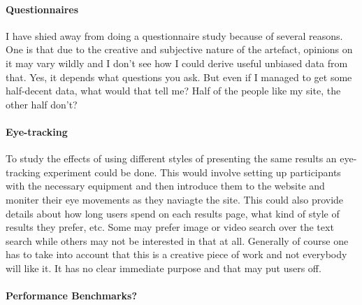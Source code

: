 \paragraph{Questionnaires}
I have shied away from doing a questionnaire study because of several reasons. One is that due to the creative and subjective nature of the artefact, opinions on it may vary wildly and I don't see how I could derive useful unbiased data from that. Yes, it depends what questions you ask. But even if I managed to get some half-decent data, what would that tell me? Half of the people like my site, the other half don't?


\paragraph{Eye-tracking}
To study the effects of using different styles of presenting the same results an eye-tracking experiment could be done. This would involve setting up participants with the necessary equipment and then introduce them to the website and moniter their eye movements as they naviagte the site. This could also provide details about how long users spend on each results page, what kind of style of results they prefer, etc. Some may prefer image or video search over the text search while others may not be interested in that at all. Generally of course one has to take into account that this is a creative piece of work and not everybody will like it. It has no clear immediate purpose and that may put users off.

\paragraph{Performance Benchmarks?}


\stopcontents[chapters]
